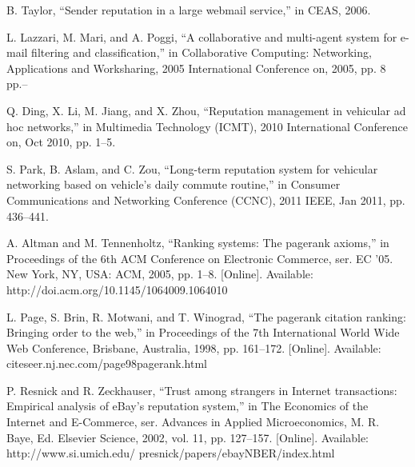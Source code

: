 %
%

%
% 
% 
%
\begin{thebibliography}{99.}
%
%
%

 B. Taylor, “Sender reputation in a large webmail service,” in CEAS, 2006.

 L. Lazzari, M. Mari, and A. Poggi, “A collaborative and multi-agent system for e-mail filtering and classification,” in Collaborative Computing: Networking, Applications and Worksharing, 2005 International Conference on, 2005, pp. 8 pp.–

 Q. Ding, X. Li, M. Jiang, and X. Zhou, “Reputation management in vehicular ad hoc networks,” in Multimedia Technology (ICMT), 2010 International Conference on, Oct 2010, pp. 1–5.

 S. Park, B. Aslam, and C. Zou, “Long-term reputation system for vehicular networking based on vehicle’s daily commute routine,” in Consumer Communications and Networking Conference (CCNC), 2011 IEEE, Jan 2011, pp. 436–441.

 A. Altman and M. Tennenholtz, “Ranking systems: The pagerank axioms,” in Proceedings of the 6th ACM Conference on Electronic Commerce, ser. EC ’05. New York, NY, USA: ACM, 2005, pp. 1–8. [Online]. Available: http://doi.acm.org/10.1145/1064009.1064010

 L. Page, S. Brin, R. Motwani, and T. Winograd, “The pagerank citation ranking: Bringing order to the web,” in Proceedings of the 7th International World Wide Web Conference, Brisbane, Australia, 1998, pp. 161–172. [Online]. Available: citeseer.nj.nec.com/page98pagerank.html

 P. Resnick and R. Zeckhauser, “Trust among strangers in Internet transactions: Empirical analysis of eBay’s reputation system,” in The Economics of the Internet and E-Commerce, ser. Advances in Applied Microeconomics, M. R. Baye, Ed. Elsevier Science, 2002, vol. 11, pp. 127–157. [Online]. Available: http://www.si.umich.edu/ presnick/papers/ebayNBER/index.html


\end{thebibliography}
